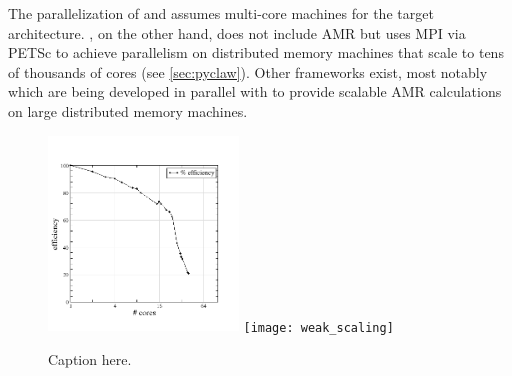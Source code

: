 The parallelization of \amrclaw and \geoclaw assumes multi-core machines for the
target architecture.  \pyclaw, on the other hand, does not include AMR but uses
MPI via PETSc to achieve parallelism on distributed memory machines that scale
to tens of thousands of cores (see \cref{sec:pyclaw}). Other frameworks exist,
most notably \forestclaw \cite{Burstedde:we} which are being developed in
parallel with \amrclaw to provide scalable AMR calculations on large distributed
memory machines. 

\begin{figure}[h]
    \centering
    \includegraphics[width=0.45\textwidth]{efficiency}
    \texttt{[image: weak\_scaling]}
    \caption{Caption here.}
    \label{fig:figure1}
\end{figure}
